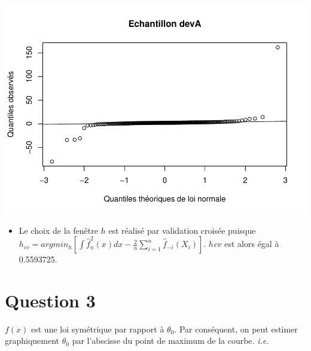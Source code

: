 \documentclass[
]{article}
\providecommand{\tightlist}{%
  \setlength{\itemsep}{0pt}\setlength{\parskip}{0pt}}
\begin{document}
\includegraphics{DM_files/figure-latex/unnamed-chunk-3-1.pdf}

\begin{itemize}
\tightlist
\item
  Le choix de la fenêtre \(h\) est réalisé par validation croisée
  puisque
  \(h_{cv} = arg min_{h}[\int \hat{f}^2_{n}(x)dx - \frac{2}{n}\sum_{i=1}^{n}\hat{f}_{-i}(X_{i})]\).
  \(h_{}cv\) est alors égal à 0.5593725.
\end{itemize}

\hypertarget{question-3}{%
\section{Question 3}\label{question-3}}

\(f(x)\) est une loi symétrique par rapport à \(\theta_{0}\). Par
conséquent, on peut estimer graphiquement \(\theta_{0}\) par l'abscisse
du point de maximum de la courbe. \emph{i.e.}
\end{document}
